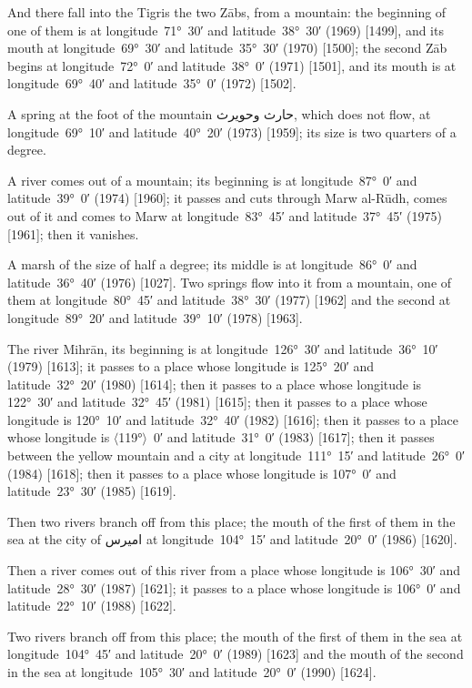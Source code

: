 \documentclass[11pt]{article}
\newcommand{\Pg}[1]{\marginpar{\footnotesize #1}}
\newcommand{\Ang}[1]{\ensuremath{#1}}
\begin{document}
And there fall into the Tigris the two Zābs, from a mountain: the beginning of one of them is at longitude~71°~30′ and latitude~38°~30′ (1969) [1499], and its mouth at longitude~69°~30′ and latitude~35°~30′ (1970) [1500]; the second Zāb begins at longitude~72°~0′ and latitude~38°~0′ (1971) [1501], and its mouth is at longitude~69°~40′ and latitude~35°~0′ (1972) [1502].

A spring at the foot of the mountain \textarabic{حارث وحويرث}, which does not flow, at longitude~69°~10′ and latitude~40°~20′ (1973) [1959]; its size is two quarters of a degree.

A river comes out of a mountain; its beginning is at longitude~87°~0′ and latitude~39°~0′ (1974) [1960]; it passes and cuts through Marw al-Rūdh, comes out of it and comes to Marw at longitude~83°~45′ and latitude~37°~45′ (1975) [1961]; then it vanishes.

A marsh of the size of half a degree; its middle is at longitude~86°~0′ and latitude~36°~40′ (1976) [1027]. Two springs flow into it from a mountain, one of them at longitude~80°~45′ and latitude~38°~30′ (1977) [1962] and the second at longitude~89°~20′ and latitude~39°~10′ (1978) [1963].

\Pg{p. 131}The river Mihrān, its beginning is at longitude~126°~30′ and latitude~36°~10′ (1979) [1613]; it passes to a place whose longitude is 125°~20′ and latitude~32°~20′ (1980) [1614]; then it passes to a place whose longitude is 122°~30′ and latitude~32°~45′ (1981) [1615]; then it passes to a place whose longitude is 120°~10′ and latitude~32°~40′ (1982) [1616]; then it passes to a place whose longitude is \Ang{\langle}119°\Ang{\rangle}~0′ and latitude~31°~0′ (1983) [1617]; then it passes between the yellow mountain and a city at longitude~111°~15′ and latitude~26°~0′ (1984) [1618]; then it passes to a place whose longitude is 107°~0′ and latitude~23°~30′ (1985) [1619].

Then two rivers branch off from this place; the mouth of the first of them in the sea at the city of \textarabic{اميرس} at longitude~104°~15′ and latitude~20°~0′ (1986) [1620].

Then a river comes out of this river from a place whose longitude is 106°~30′ and latitude~28°~30′ (1987) [1621]; it passes to a place whose longitude is 106°~0′ and latitude~22°~10′ (1988) [1622].

Two rivers branch off from this place; the mouth of the first of them in the sea at longitude~104°~45′ and latitude~20°~0′ (1989) [1623] and the mouth of the second in the sea at longitude~105°~30′ and latitude~20°~0′ (1990) [1624].
\end{document}
